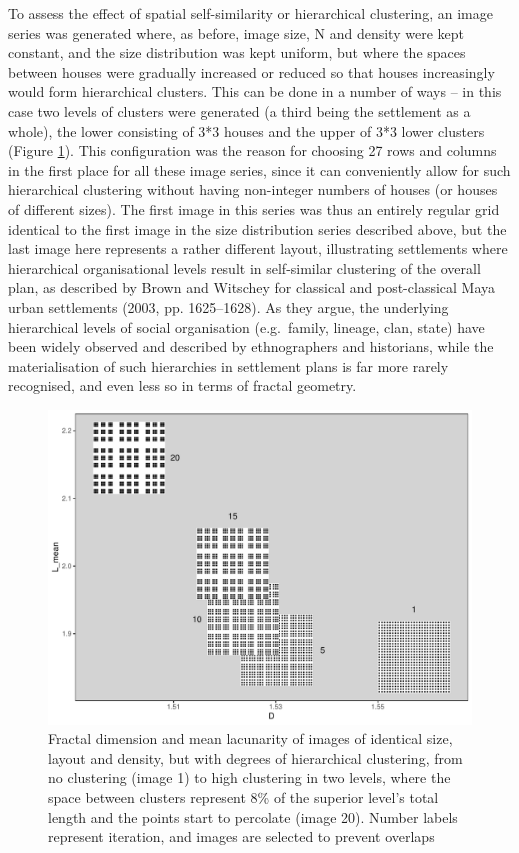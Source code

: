 \documentclass[
  12pt,
]{book}
\begin{document}
To assess the effect of spatial self-similarity or hierarchical clustering, an image series was generated where, as before, image size, N and density were kept constant, and the size distribution was kept uniform, but where the spaces between houses were gradually increased or reduced so that houses increasingly would form hierarchical clusters. This can be done in a number of ways -- in this case two levels of clusters were generated (a third being the settlement as a whole), the lower consisting of 3*3 houses and the upper of 3*3 lower clusters (Figure \ref{fig:08-clustering-im}). This configuration was the reason for choosing 27 rows and columns in the first place for all these image series, since it can conveniently allow for such hierarchical clustering without having non-integer numbers of houses (or houses of different sizes). The first image in this series was thus an entirely regular grid identical to the first image in the size distribution series described above, but the last image here represents a rather different layout, illustrating settlements where hierarchical organisational levels result in self-similar clustering of the overall plan, as described by Brown and Witschey for classical and post-classical Maya urban settlements (2003, pp. 1625--1628). As they argue, the underlying hierarchical levels of social organisation (e.g.~family, lineage, clan, state) have been widely observed and described by ethnographers and historians, while the materialisation of such hierarchies in settlement plans is far more rarely recognised, and even less so in terms of fractal geometry.

\begin{figure}
\hypertarget{fig:08-clustering-im}{%
\centering
\includegraphics{Results/fig08_clustering_im.pdf}
\caption{Fractal dimension and mean lacunarity of images of identical size, layout and density, but with degrees of hierarchical clustering, from no clustering (image 1) to high clustering in two levels, where the space between clusters represent 8\% of the superior level's total length and the points start to percolate (image 20). Number labels represent iteration, and images are selected to prevent overlaps}\label{fig:08-clustering-im}
}
\end{figure}
\end{document}
